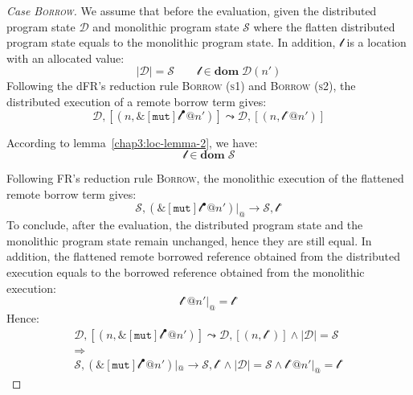 \begin{proof}[Case \textsc{\emph{Borrow}}]
We assume that before the evaluation, given the distributed program state $\mathcal{D}$ and monolithic program state $\mathcal{S}$ where the flatten distributed program state equals to the monolithic program state. In addition, $\mathscr{l}$ is a location with an allocated value:
\[
|\mathcal{D}| = \mathcal{S} \quad\quad \mathscr{l} \in \textbf{dom}\; \mathcal{D}(n')
\]
Following the dFR's reduction rule \textsc{Borrow (s1)} and \textsc{Borrow (s2)}, the distributed execution of a remote borrow term gives:
\[
\mathcal{D}, [(n, \&[\texttt{mut}]\mathscr{l}^\bullet@n')] \leadsto \mathcal{D}, [(n, \mathscr{l}^\circ@n')]
\]
\begin{highlightnew}
According to lemma~\ref{chap3:loc-lemma-2}, we have:
\[\mathscr{l} \in \textbf{dom}\; \mathcal{S}\] 
\end{highlightnew}
Following FR's reduction rule \textsc{Borrow}, the monolithic execution of the flattened remote borrow term gives:
\[
\mathcal{S}, (\&[\texttt{mut}]\mathscr{l}^\bullet@n')|_@ \longrightarrow \mathcal{S}, \mathscr{l}^\circ
\]
To conclude, after the evaluation, the distributed program state and the monolithic program state remain unchanged, hence they are still equal. In addition, the flattened remote borrowed reference obtained from the distributed execution equals to the borrowed reference obtained from the monolithic execution:
\[
\mathscr{l}^\circ@n'|_@ = \mathscr{l}^\circ
\]
Hence:
\begin{gather*}
\mathcal{D}, [(n, \&[\texttt{mut}]\mathscr{l}^\bullet@n')] \leadsto \mathcal{D}, [(n, \mathscr{l}^\circ)] \land |\mathcal{D}| = \mathcal{S} \\\Rightarrow\\ \mathcal{S}, (\&[\texttt{mut}]\mathscr{l}^\bullet@n')|_@ \longrightarrow \mathcal{S}, \mathscr{l}^\circ \land |\mathcal{D}| = \mathcal{S} \land \mathscr{l}^\circ@n'|_@ = \mathscr{l}^\circ
\end{gather*}
\end{proof}
